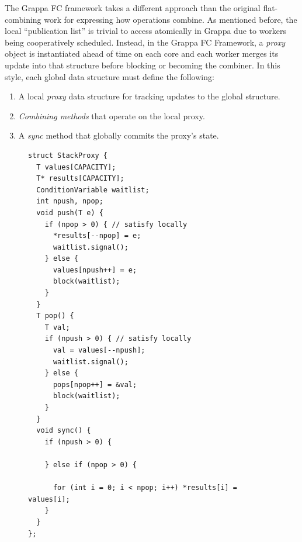 The Grappa FC framework takes a different approach than the original flat-combining work for expressing how operations combine. As mentioned before, the local ``publication list'' is trivial to access atomically in Grappa due to workers being cooperatively scheduled.
Instead, in the Grappa FC Framework, a \emph{proxy} object is instantiated ahead of time on each core and each worker merges its update into that structure before blocking or becoming the combiner.
In this style, each global data structure must define the following:
\begin{enumerate}
  \item A local \emph{proxy} data structure for tracking updates to the global structure.
  \item \emph{Combining methods} that operate on the local proxy.
  \item A \emph{sync} method that globally commits the proxy's state.
\end{enumerate}

\begin{figure}[t]
\centering
\begin{lstlisting}[style=grappa]
struct StackProxy {
  T values[CAPACITY];
  T* results[CAPACITY];
  ConditionVariable waitlist;
  int npush, npop;
  void push(T e) {
    if (npop > 0) { // satisfy locally
      *results[--npop] = e;
      waitlist.signal();
    } else {
      values[npush++] = e;
      block(waitlist);
    }
  }
  T pop() {
    T val;
    if (npush > 0) { // satisfy locally
      val = values[--npush];
      waitlist.signal();
    } else {
      pops[npop++] = &val;
      block(waitlist);
    }
  }
  void sync() {
    if (npush > 0) {
      
    } else if (npop > 0) {
      
      for (int i = 0; i < npop; i++) *results[i] = values[i];
    }
  }
};
\end{lstlisting}
\end{figure}

